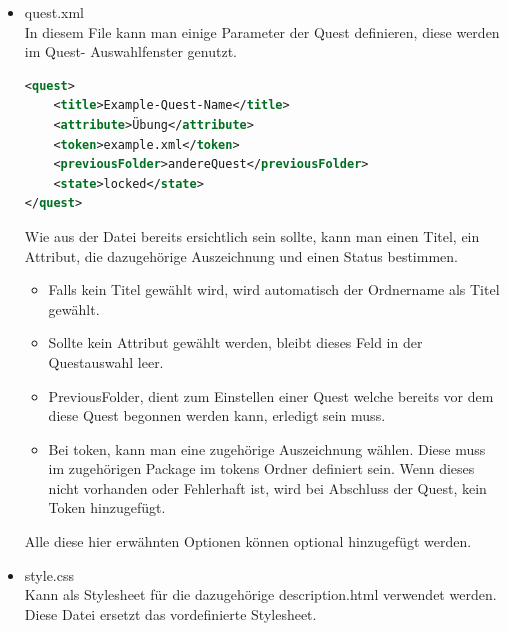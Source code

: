\begin{itemize}
\item quest.xml\\
In diesem File kann man einige Parameter der Quest definieren, diese werden im Quest- Auswahlfenster genutzt.

\begin{lstlisting}[language=XML]
<quest>
    <title>Example-Quest-Name</title>
    <attribute>Übung</attribute>
    <token>example.xml</token>
    <previousFolder>andereQuest</previousFolder>
    <state>locked</state>
</quest>
\end{lstlisting}
Wie aus der Datei bereits ersichtlich sein sollte, kann man einen Titel, ein Attribut, die dazugehörige Auszeichnung und einen Status bestimmen. 
\begin{itemize}
	\item Falls kein Titel gewählt wird, wird automatisch der Ordnername als Titel gewählt. 
\item Sollte kein Attribut gewählt werden, bleibt dieses Feld in der Questauswahl leer.
\item PreviousFolder, dient zum Einstellen einer Quest welche bereits vor dem diese Quest begonnen werden kann, erledigt sein muss.
\item Bei token, kann man eine zugehörige Auszeichnung wählen. Diese muss im zugehörigen Package im tokens Ordner definiert sein. Wenn dieses nicht vorhanden oder Fehlerhaft ist, wird bei Abschluss der Quest, kein Token hinzugefügt.
\end{itemize}
Alle diese hier erwähnten Optionen können optional hinzugefügt werden.
\item style.css\\
Kann als Stylesheet für die dazugehörige description.html verwendet werden. Diese Datei ersetzt das vordefinierte Stylesheet.

\end{itemize}

